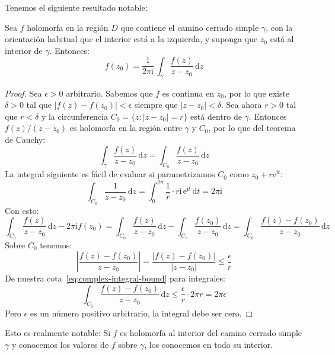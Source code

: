   Tenemos el siguiente resultado notable:
  \begin{theorem}
    \label{theo:Cauchy-integral-formula}
    Sea \(f\) holomorfa en la región \(D\)
    que contiene el camino cerrado simple \(\gamma\),
    con la orientación habitual que el interior está a la izquierda,
    y suponga que \(z_0\) está al interior de \(\gamma\).
    Entonces:
    \begin{equation*}
      f(z_0)
	= \frac{1}{2 \pi \mathrm{i}} \,
	    \int_\gamma	 \frac{f(z)}{z - z_0} \, \mathrm{d} z
    \end{equation*}
  \end{theorem}
  \begin{proof}
    Sea \(\epsilon > 0\) arbitrario.
    Sabemos que \(f\) es continua en \(z_0\),
    por lo que existe \(\delta > 0\) tal que
    \(\lvert f(z) - f(z_0) \rvert < \epsilon\)
    siempre que \(\lvert z - z_0 \rvert < \delta\).
    Sea ahora \(r > 0\) tal que \(r < \delta\)
    y la circunferencia
      \(C_0 = \{ z \colon \lvert z - z_0 \rvert = r\}\)
    está dentro de \(\gamma\).
    Entonces \(f(z) / (z - z_0)\) es holomorfa
    en la región entre \(\gamma\) y \(C_0\),
    por lo que del teorema de Cauchy:
    \begin{equation*}
      \int_\gamma \frac{f(z)}{z - z_0} \, \mathrm{d} z
	= \int_{C_0} \frac{f(z)}{z - z_0} \, \mathrm{d} z
    \end{equation*}
    La integral siguiente es fácil de evaluar
    si parametrizamos \(C_0\)
    como \(z_0 + r \mathrm{e}^{\mathrm{i} t}\):
    \begin{equation*}
      \int_{C_0} \frac{1}{z - z_0} \, \mathrm{d} z
	= \int_0^{2 \pi} \frac{1}{r}
			   \cdot r \mathrm{i}
			     \, \mathrm{e}^{\mathrm{i} t}
			   \, \mathrm{d} t
	= 2 \pi \mathrm{i}
    \end{equation*}
    Con esto:
    \begin{equation*}
      \int_{C_0} \frac{f(z)}{z - z_0} \, \mathrm{d} z
	- 2 \pi \mathrm{i} f(z_0)
	= \int_{C_0} \frac{f(z)}{z - z_0} \, \mathrm{d} z
	    - \int_{C_0} \frac{f(z_0)}{z - z_0} \, \mathrm{d} z
	= \int_{C_0} \frac{f(z) - f(z_0)}{z - z_0} \, \mathrm{d} z
    \end{equation*}
    Sobre \(C_0\) tenemos:
    \begin{equation*}
      \left\lvert \frac{f(z) - f(z_0)}{z - z_0} \right\rvert
	= \frac{\lvert f(z) - f(z_0) \rvert}{\lvert z - z_0 \rvert}
	\le \frac{\epsilon}{r}
    \end{equation*}
    De nuestra cota~\eqref{eq:complex-integral-bound}
    para integrales:
    \begin{equation*}
      \int_{C_0} \frac{f(z) - f(z_0)}{z - z_0} \, \mathrm{d} z
	\le \frac{\epsilon}{r} \cdot 2 \pi r
	= 2 \pi \epsilon
    \end{equation*}
    Pero \(\epsilon\) es un número positivo arbitrario,
    la integral debe ser cero.
  \end{proof}
  Esto es realmente notable:
  Si \(f\) es holomorfa
  al interior del camino cerrado simple \(\gamma\)
  y conocemos los valores de \(f\) sobre \(\gamma\),
  los conocemos en todo su interior.

